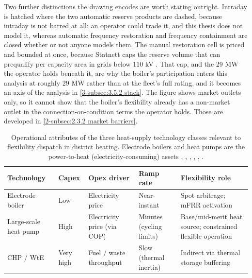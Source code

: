 Two further distinctions the drawing encodes are worth stating outright. Intraday is hatched where the two automatic reserve products are dashed, because intraday is not barred at all: an operator could trade it, and this thesis does not model it, whereas automatic frequency restoration and frequency containment are closed whether or not anyone models them. The manual restoration cell is priced and bounded at once, because Statnett caps the reserve volume that can prequalify per capacity area in grids below 110 kV \cite{statnett_innforing_2026}. That cap, and the 29 MW the operator holds beneath it, are why the boiler's participation enters this analysis at roughly 29 MW rather than at the fleet's full rating, and it becomes an axis of the analysis in \autoref{3-subsec:3.5.2 stack}. The figure shows market outlets only, so it cannot show that the boiler's flexibility already has a non-market outlet in the connection-on-condition terms the operator holds. Those are developed in \autoref{2-subsec:2.3.2 market barriers}.


\begin{table}[!ht]
\centering
\caption{Operational attributes of the three heat-supply technology
classes relevant to flexibility dispatch in district heating. Electrode
boilers and heat pumps are the power-to-heat (electricity-consuming)
assets \cite{bloes_power--heat_2018}, \cite{david_heat_2017}, \cite{bach_integration_2016}, \cite{monie_power--heat_2022}, \cite{gronli_hvor_2025}, \cite{beiron_combined_2020}.}
\label{tab:2.2.2 P2H comparison}
\small
\begin{tabular}{>{\raggedright}p{3.0cm}
                >{\raggedright}p{2.2cm}
                >{\raggedright}p{2.2cm}
                >{\raggedright}p{2.0cm}
                >{\raggedright\arraybackslash}p{3.8cm}}
    \toprule
        \textbf{Technology} &
        \textbf{Capex} &
        \textbf{Opex driver} &
        \textbf{Ramp rate} &
        \textbf{Flexibility role} \\
    \midrule
        Electrode boiler &
        Low &
        Electricity price &
        Near-instant &
        Spot arbitrage; mFRR activation \\[4pt]
        Large-scale heat pump &
        High &
        Electricity price (via COP) &
        Minutes (cycling limits) &
        Base/mid-merit heat source; constrained flexible operation \\[4pt]
        CHP / WtE &
        Very high &
        Fuel / waste throughput &
        Slow (thermal inertia) &
        Indirect via thermal storage buffering \\
    \bottomrule
\end{tabular}
\end{table}


